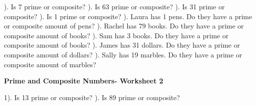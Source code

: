 \documentclass{article}%
\begin{document}
\newline%
\newline%
). Is 7 prime or composite?%
\newline%
\newline%
). Is 63 prime or composite?%
\newline%
\newline%
). Is 31 prime or composite?%
\newline%
\newline%
). Is 1 prime or composite?%
\newline%
\newline%
). Laura has 1 pens. Do they have a prime or composite amount of pens?%
\newline%
\newline%
). Rachel has 79 books. Do they have a prime or composite amount of books?%
\newline%
\newline%
). Sam has 3 books. Do they have a prime or composite amount of books?%
\newline%
\newline%
). James has 31 dollars. Do they have a prime or composite amount of dollars?%
\newline%
\newline%
). Sally has 19 marbles. Do they have a prime or composite amount of marbles?%
\newline%
\newline%
\newline%
\pagebreak%
\large%
\begin{center}%
\textbf{Prime and Composite Numbers- Worksheet 2}%
\newline%
\end{center} \normalsize%
1). Is 13 prime or composite?%
\newline%
\newline%
). Is 89 prime or composite?%
\newline%
\newline%
\newline%
\end{document}
